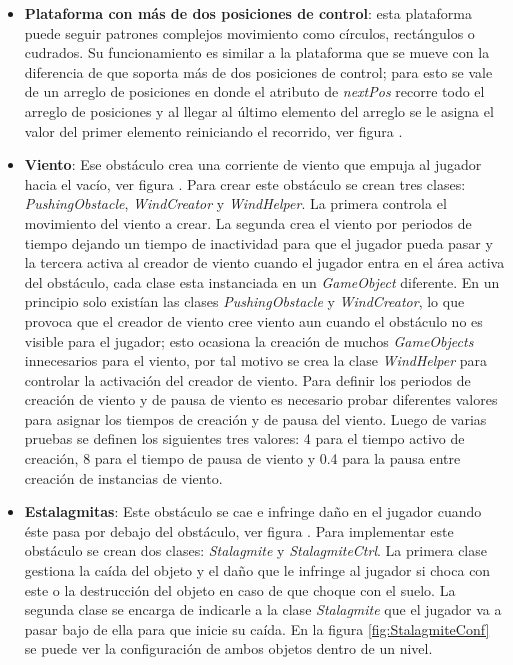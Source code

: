 \begin{itemize}
		\item \textbf{Plataforma con más de dos posiciones de control}: esta plataforma 
		puede seguir patrones complejos movimiento como círculos, rectángulos o 
		cudrados. Su funcionamiento es similar a la plataforma que se mueve con la 
		diferencia de que soporta más de dos posiciones de control; para esto se vale 
		de un arreglo de posiciones en donde el atributo de \textit{nextPos} recorre 
		todo el arreglo de posiciones y al llegar al último elemento del arreglo se 
		le asigna el valor del primer elemento reiniciando el recorrido, ver figura . 

		\item \textbf{Viento}: Ese obstáculo crea una corriente de viento que empuja 
		al jugador hacia el vacío, ver figura . Para crear este obstáculo se crean 
		tres clases: \textit{PushingObstacle}, \textit{WindCreator} y 
		\textit{WindHelper}. La primera controla el movimiento del viento a crear. 
		La segunda crea el viento por periodos de tiempo dejando un tiempo de 
		inactividad para que el jugador pueda pasar y la tercera activa al creador 
		de viento cuando el jugador entra en el área activa del obstáculo, cada clase 
		esta instanciada en un \textit{GameObject} diferente. En un principio solo 
		existían las clases \textit{PushingObstacle} y \textit{WindCreator}, lo que 
		provoca que el creador de viento cree viento aun cuando el obstáculo no es 
		visible para el jugador; esto ocasiona la creación de muchos 
		\textit{GameObjects} innecesarios para el viento, por tal motivo se crea la 
		clase \textit{WindHelper} para controlar la activación del 
		creador de viento.  Para definir los periodos de creación de viento y de pausa 
		de viento es necesario probar diferentes valores para asignar los tiempos de 
		creación y de pausa del viento. Luego de varias pruebas se definen los 
		siguientes tres valores: 4 para el tiempo activo de creación, 8 para el tiempo 
		de pausa de viento y 0.4 para la pausa entre creación de instancias de viento.

		\item \textbf{Estalagmitas}: Este obstáculo se cae e infringe daño en el 
		jugador cuando éste pasa por debajo del obstáculo, ver figura .  Para 
		implementar este obstáculo se crean dos clases: \textit{Stalagmite} y 
		\textit{StalagmiteCtrl}. La primera clase gestiona la caída del objeto y el 
		daño que le infringe al jugador si choca con este o la destrucción del objeto 
		en caso de que choque con el suelo. La segunda clase se encarga de indicarle 
		a la clase \textit{Stalagmite} que el jugador va a pasar bajo de ella para que 
		inicie su caída. En la figura \ref{fig:StalagmiteConf} se puede ver la 
		configuración de ambos objetos dentro de un nivel.
		

\end{itemize}
